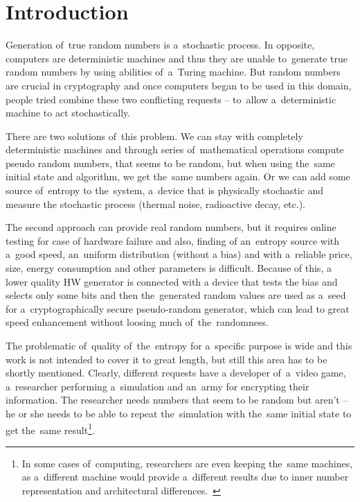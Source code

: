 \chapter{Introduction}
\par{
Generation of~true random numbers is a~stochastic process.
In opposite, computers are deterministic machines 
and thus they are unable to~generate true random numbers by using abilities 
of~a~Turing machine. 
But random numbers are crucial in cryptography and once computers began 
to be used in this domain, people tried combine these two conflicting requests 
-- to~allow a~deterministic machine to act stochastically. 
}

\par{
There are two solutions of~this problem. We can stay with completely 
deterministic machines and through series of~mathematical operations 
compute pseudo random numbers, that seems to be random, 
but when using the~same initial state and algorithm, we get the~same 
numbers again. Or we can add some source of~entropy to the~system, 
a~device that is physically stochastic and measure the stochastic process 
(thermal noise, radioactive decay, etc.).
}

\par{
The second approach can provide real random numbers, but it requires online 
testing for case of hardware failure and also, finding of an~entropy source with
a~good speed, an~uniform distribution (without a bias) and with a~reliable price,
size, energy consumption and other parameters is difficult. Because of this, 
a lower quality HW generator is connected with a device that tests the bias 
and selects only some bits and then the~generated random values are used 
as a~seed for a~cryptographically secure pseudo-random generator, 
which can lead to great speed enhancement without loosing much 
of~the~randomness.
}

\par{
The problematic of~quality of~the~entropy for a~specific purpose is wide 
and this work is not intended to cover it to great length, but still this area 
has to be shortly mentioned. Clearly, different requests have a developer 
of~a~video game, a~researcher performing a~simulation and an~army 
for encrypting their information. 
The researcher needs numbers that seem to be random but aren't 
-- he or she needs to be able to repeat the~simulation with the~same initial state 
to get the~same result\footnote{In some cases of~computing, 
researchers are even keeping the~same machines, as a~different machine 
would provide a~different results due to inner number representation and architectural differences.~\cite{ArithmeticInCloud}}.
}

